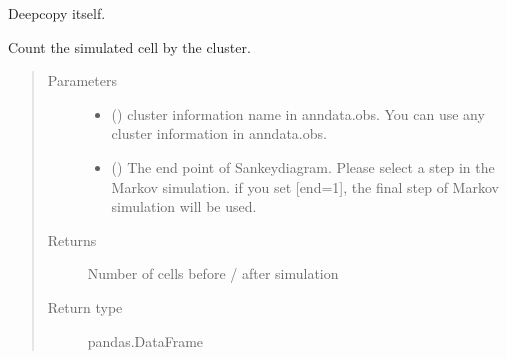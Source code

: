 \documentclass[letterpaper,10pt,english]{sphinxmanual}
\begin{document}
\begin{fulllineitems}
\begin{fulllineitems}
\begin{quote}
\begin{description}
\end{description}\end{quote}

\end{fulllineitems}


\begin{fulllineitems}
\label{\detokenize{modules/celloracle:celloracle.Oracle.copy}}
Deepcopy itself.

\end{fulllineitems}


\begin{fulllineitems}
\label{\detokenize{modules/celloracle:celloracle.Oracle.count_cells_in_mc_resutls}}
Count the simulated cell by the cluster.
\begin{quote}\begin{description}
\item[{Parameters}] \leavevmode\begin{itemize}
\item {} 
 () \textendash{} cluster information name in anndata.obs.
You can use any cluster information in anndata.obs.

\item {} 
 () \textendash{} The end point of Sankey\sphinxhyphen{}diagram. Please select a  step in the Markov simulation.
if you set {[}end=\sphinxhyphen{}1{]}, the final step of Markov simulation will be used.

\end{itemize}

\item[{Returns}] \leavevmode
Number of cells before / after simulation

\item[{Return type}] \leavevmode
pandas.DataFrame


\end{description}
\end{quote}
\end{fulllineitems}
\end{fulllineitems}
\end{document}
